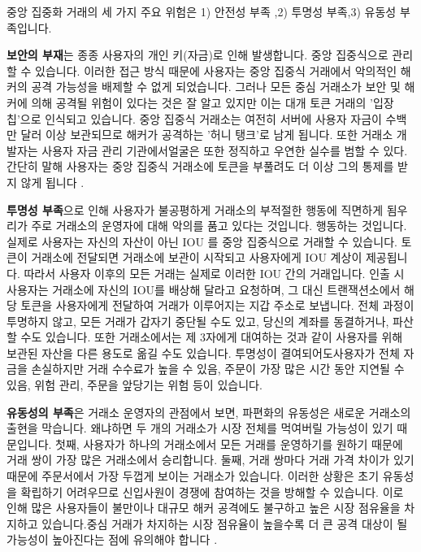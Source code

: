\documentclass{article}
\begin{document}
\begin{multicols}{2}
\indent 중앙 집중화 거래의 세 가지 주요 위험은 1) 안전성 부족 ,2) 투명성 부족,3) 유동성 부족입니다.

\indent \textbf{보안의 부재}는 종종 사용자의 개인 키(자금)로 인해 발생합니다. 중앙 집중식으로 관리할 수 있습니다. 이러한 접근 방식 때문에 사용자는 중앙 집중식 거래에서 악의적인 해커의 공격 가능성을 배제할 수 없게 되었습니다. 그러나 모든 중심 거래소가 보안 및 해커에 의해 공격될 위험이 있다는 것은 잘 알고 있지만\cite{coincheckhack}  \cite{mcmillan2014inside} 이는 대개 토큰 거래의 '입장 칩'으로 인식되고 있습니다. 중앙 집중식 거래소는 여전히 서버에 사용자 자금이 수백만 달러 이상 보관되므로 해커가 공격하는 '허니 탱크'로 남게 됩니다. 또한 거래소 개발자는 사용자 자금 관리 기관에서얼굴은 또한 정직하고 우연한 실수를 범할 수 있다. 간단히 말해 사용자는 중앙 집중식 거래소에 토큰을 부풀려도 더 이상 그의 통제를 받지 않게 됩니다 .

\indent \textbf{투명성 부족}으로 인해 사용자가 불공평하게 거래소의 부적절한 행동에 직면하게 됨우리가 주로 거래소의 운영자에 대해 악의를 품고 있다는 것입니다. 행동하는 것입니다. 실제로 사용자는 자신의 자산이 아닌 IOU 를 중앙 집중식으로 거래할 수 있습니다. 토큰이 거래소에 전달되면 거래소에 보관이 시작되고 사용자에게 IOU 계상이 제공됩니다. 따라서 사용자 이후의 모든 거래는 실제로 이러한 IOU 간의 거래입니다. 인출 시 사용자는 거래소에 자신의 IOU를 배상해 달라고 요청하며, 그 대신 트랜잭션소에서 해당 토큰을 사용자에게 전달하여 거래가 이루어지는 지갑 주소로 보냅니다. 전체 과정이 투명하지 않고, 모든 거래가 갑자기 중단될 수도 있고, 당신의 계좌를 동결하거나, 파산할 수도 있습니다. 또한 거래소에서는 제 3자에게 대여하는 것과 같이 사용자를 위해 보관된 자산을 다른 용도로 옮길 수도 있습니다. 투명성이 결여되어도사용자가 전체 자금을 손실하지만 거래 수수료가 높을 수 있음, 주문이 가장 많은 시간 동안 지연될 수 있음, 위험 관리, 주문을 앞당기는 위험 등이 있습니다.

\indent \textbf{유동성의 부족}은 거래소 운영자의 관점에서 보면, 파편화의 유동성은 새로운 거래소의 출현을 막습니다. 왜냐하면 두 개의 거래소가 시장 전체를 먹여버릴 가능성이 있기 때문입니다. 첫째, 사용자가 하나의 거래소에서 모든 거래를 운영하기를 원하기 때문에 거래 쌍이 가장 많은 거래소에서 승리합니다. 둘째, 거래 쌍마다 거래 가격 차이가 있기 때문에 주문서에서 가장 두껍게 보이는 거래소가 있습니다. 이러한 상황은 초기 유동성을 확립하기 어려우므로 신입사원이 경쟁에 참여하는 것을 방해할 수 있습니다. 이로 인해 많은 사용자들이 불만이나 대규모 해커 공격에도 불구하고 높은 시장 점유율을 차지하고 있습니다.중심 거래가 차지하는 시장 점유율이 높을수록 더 큰 공격 대상이 될 가능성이 높아진다는 점에 유의해야 합니다 .


\end{multicols}
\end{document}
